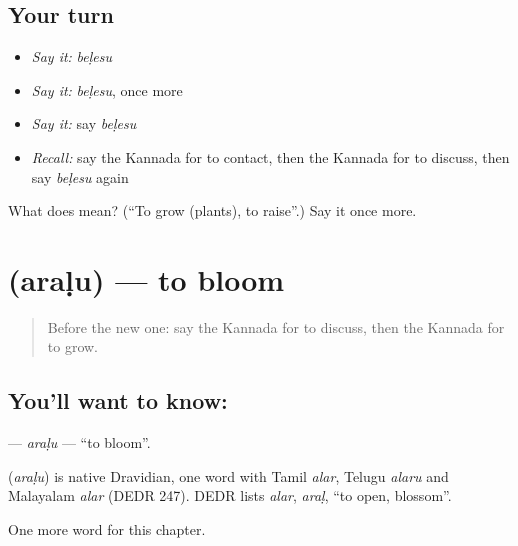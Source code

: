 \subsection*{Your turn}
\begin{itemize}
\raggedright
  \item \emph{Say it:} \emph{beḷesu}
  \item \emph{Say it:} \emph{beḷesu}, once more
  \item \emph{Say it:} say \emph{beḷesu}
  \item \emph{Recall:} say the Kannada for to contact, then the Kannada for to discuss, then say \emph{beḷesu} again
\end{itemize}

\begin{tcolorbox}[breakable,colback=teal!4,colframe=teal!35!black,title={Before you move on}]
What does  mean? (\textquotedblleft{}To grow (plants), to raise\textquotedblright{}.) Say it once more.
\end{tcolorbox}
\section[\texorpdfstring{\kn{ಅರಳು} (araḷu)}{ಅರಳು (araḷu)}]{ (araḷu) — to bloom}

\label{lesson:KA-C203-aralu}



\begin{quote}
Before the new one: say the Kannada for to discuss, then the Kannada for to grow.
\end{quote}

\subsection*{You'll want to know: }
\textbf{} — \emph{araḷu} — \textquotedblleft{}to bloom\textquotedblright{}.

\begin{cousinweb}
\textbf{} (\emph{araḷu}) is native Dravidian, one word with Tamil \emph{alar}, Telugu \emph{alaru} and Malayalam \emph{alar} (DEDR 247). DEDR lists \emph{alar}, \emph{araḷ}, \textquotedblleft{}to open, blossom\textquotedblright{}.
\end{cousinweb}

\begin{grammarlens}[title={What you've built}]
One more word for this chapter.
\end{grammarlens}


